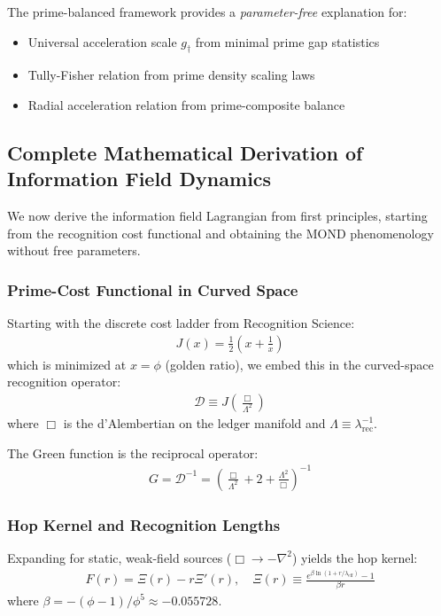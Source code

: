 \documentclass[12pt]{article}
\begin{document}
The prime-balanced framework provides a \textit{parameter-free} explanation for:
\begin{itemize}
\item Universal acceleration scale $g_\dagger$ from minimal prime gap statistics
\item Tully-Fisher relation from prime density scaling laws
\item Radial acceleration relation from prime-composite balance
\end{itemize}

\subsection{Complete Mathematical Derivation of Information Field Dynamics}

We now derive the information field Lagrangian from first principles, starting from the recognition cost functional and obtaining the MOND phenomenology without free parameters.

\subsubsection{Prime-Cost Functional in Curved Space}

Starting with the discrete cost ladder from Recognition Science:
\begin{align}
J(x) = \frac{1}{2}\left(x + \frac{1}{x}\right)
\end{align}
which is minimized at $x = \phi$ (golden ratio), we embed this in the curved-space recognition operator:
\begin{align}
\mathcal{D} \equiv J\left(\frac{\Box}{\Lambda^2}\right)
\end{align}
where $\Box$ is the d'Alembertian on the ledger manifold and $\Lambda \equiv \lambda_{\text{rec}}^{-1}$.

The Green function is the reciprocal operator:
\begin{align}
G = \mathcal{D}^{-1} = \left(\frac{\Box}{\Lambda^2} + 2 + \frac{\Lambda^2}{\Box}\right)^{-1}
\end{align}

\subsubsection{Hop Kernel and Recognition Lengths}

Expanding for static, weak-field sources ($\Box \to -\nabla^2$) yields the hop kernel:
\begin{align}
F(r) = \Xi(r) - r\Xi'(r), \quad \Xi(r) \equiv \frac{e^{\beta\ln(1+r/\lambda_{\text{eff}})}-1}{\beta r}
\end{align}
where $\beta = -({\phi-1})/{\phi^5} \approx -0.055728$.
\end{document}
